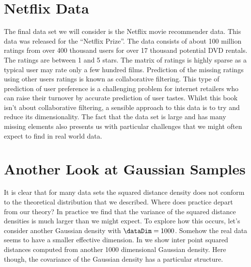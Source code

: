 
\section{Netflix Data}

The final data set we will consider is the Netflix movie recommender
data. This data was released for the ``Netflix Prize''. The data
consists of about 100 million ratings from over 400 thousand users for
over 17 thousand potential DVD rentals. The ratings are between 1 and
5 stars. The matrix of ratings is highly sparse as a typical user may
rate only a few hundred films. Prediction of the missing ratings using
other users ratings is known as collaborative filtering. This type of
prediction of user preference is a challenging problem for internet
retailers who can raise their turnover by accurate prediction of user
tastes. Whilst this book isn't about collaborative filtering, a
sensible approach to this data is to try and reduce its
dimensionality. The fact that the data set is large and has many
missing elements also presents us with particular challenges that we
might often expect to find in real world data.


\section{Another Look at Gaussian Samples}\label{sec:anotherLook}

It is clear that for many data sets the squared distance density does
not conform to the theoretical distribution that we described. Where
does practice depart from our theory? In practice we find that the
variance of the squared distance densities is much larger than we
might expect. To explore how this occurs, let's consider another
Gaussian density with $\dataDim=1000$. Somehow the real data seems to
have a smaller effective dimension. In  we
show inter point squared distances computed from another 1000
dimensional Gaussian density. Here though, the covariance of the
Gaussian density has a particular structure.

